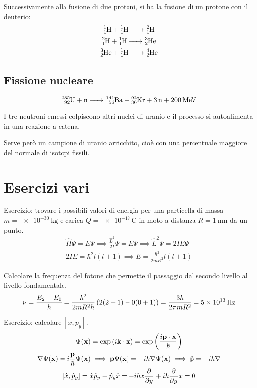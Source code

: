 Successivamente alla fusione di due protoni, si ha la fusione di un protone con il deuterio:
\begin{gather}
    \ce{^1_1H + ^1_1H -> ^2_1H} \\
    \ce{^2_1H + ^1_1H -> ^3_2He} \\
    \ce{^3_2He + ^1_1H -> ^4_2He}
\end{gather}

\subsection{Fissione nucleare}

\begin{equation}
    \ce{^{235}_{92}U + n -> ^{141}_{56}Ba + ^{92}_{36}Kr + 3 n + \qty{200}{\mega\electronvolt}}
\end{equation}

I tre neutroni emessi colpiscono altri nuclei di uranio e il processo si autoalimenta in una reazione a catena.

Serve però un campione di uranio arricchito, cioè con una percentuale maggiore del normale di isotopi fissili.

\section{Esercizi vari}

Esercizio: trovare i possibili valori di energia per una particella di massa $m = \qty{e-30}{\kilo\gram}$ e carica $Q = \qty{e-19}{\coulomb}$ in moto a distanza $R = \qty{1}{\nano\metre}$ da un punto.
\begin{gather}
    \hat{H} \Psi = E \Psi \implies \frac{\hat{L}^2}{2 I} \Psi = E \Psi
    \implies
    \hat{L}^2 \Psi = 2 I E \Psi \\
    2 I E = \hbar^2 l (l + 1) \implies E = \frac{\hbar^2}{2 m R^2} l (l + 1)
\end{gather}

Calcolare la frequenza del fotone che permette il passaggio dal secondo livello al livello fondamentale.
\begin{equation}
    \nu = \frac{E_2 - E_0}{h} = \frac{\hbar^2}{2 m R^2 h} \left( 2 (2 + 1) - 0 (0 + 1) \right)
    = \frac{3 \hbar}{2 \pi m R^2}
    = \qty{5e13}{\hertz}
\end{equation}

Esercizio:
calcolare $[x, p_y]$.
\begin{gather}
    \Psi(\vt{x}) = \exp{\im \vt{k} \cdot \vt{x}} = \exp{\frac{\im \vt{p} \cdot \vt{x}}{\hbar}} \\
    \grad \Psi(\vt{x}) = \im \frac{\vt{p}}{\hbar} \Psi(\vt{x})
    \implies \vt{p} \Psi(\vt{x}) = -\im \hbar \grad \Psi(\vt{x})
    \implies \hat{\vt{p}} = -\im \hbar \grad \\
    [\hat{x}, \hat{p}_y] = \hat{x} \hat{p}_y - \hat{p}_y \hat{x} = -\im \hbar x \parder{y} + \im \hbar \parder{y} x = 0
\end{gather}

